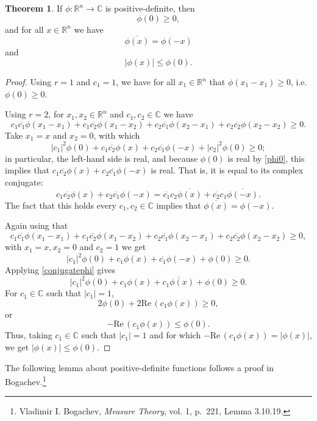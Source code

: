 \documentclass{article}
\def\Re{\ensuremath{\mathrm{Re}}\,}
\theoremstyle{definition}
\newtheorem{theorem}{Theorem}
\theoremstyle{definition}
\begin{document}
\begin{theorem}
If $\phi:\mathbb{R}^n \to \mathbb{C}$ is positive-definite, then
\begin{equation}
\phi(0) \geq 0,
\label{phi0}
\end{equation}
and for all $x \in \mathbb{R}^n$ we have
\begin{equation}
\overline{\phi(x)}=\phi(-x)
\label{conjugatephi}
\end{equation}
and
\begin{equation}
|\phi(x)| \leq \phi(0).
\label{phix}
\end{equation}
\end{theorem}
\begin{proof}
Using $r=1$ and $c_1=1$, we have for all $x_1 \in \mathbb{R}^n$ that
$\phi(x_1-x_1) \geq 0$,
i.e. $\phi(0) \geq 0$.

Using $r=2$,
for $x_1,x_2 \in \mathbb{R}^n$
and $c_1,c_2 \in \mathbb{C}$ we have
\[
c_1\overline{c_1}\phi(x_1-x_1)+c_1\overline{c_2}\phi(x_1-x_2)+c_2\overline{c_1}\phi(x_2-x_1)
+c_2\overline{c_2} \phi(x_2-x_2) \geq 0.
\]
Take $x_1=x$ and $x_2=0$, with which
\[
|c_1|^2 \phi(0) + c_1\overline{c_2} \phi(x)+c_2\overline{c_1}\phi(-x)+|c_2|^2 \phi(0) \geq 0;
\]
in particular, the left-hand side is real, and because $\phi(0)$ is real by \eqref{phi0}, this implies that
$c_1\overline{c_2} \phi(x)+c_2\overline{c_1}\phi(-x)$ is real. That is, it is equal to its complex conjugate:
\[
c_1\overline{c_2} \phi(x)+c_2\overline{c_1}\phi(-x) = \overline{c_1}c_2 \overline{\phi(x)}+\overline{c_2}c_1\overline{\phi(-x)}.
\]
The fact that this holds  every $c_1,c_2 \in \mathbb{C}$ implies that $\overline{\phi(x)} = \phi(-x)$. 

Again using that 
\[
c_1\overline{c_1}\phi(x_1-x_1)+c_1\overline{c_2}\phi(x_1-x_2)+c_2\overline{c_1}\phi(x_2-x_1)
+c_2\overline{c_2} \phi(x_2-x_2) \geq 0,
\]
 with $x_1=x,x_2=0$ and $c_2=1$ we get
\[
|c_1|^2\phi(0) +c_1\phi(x)+\overline{c_1}\phi(-x)+\phi(0) \geq 0.
\]
Applying \eqref{conjugatephi} gives
\[
|c_1|^2 \phi(0)+c_1\phi(x)+\overline{c_1 \phi(x)} + \phi(0) \geq 0.
\]
For $c_1 \in \mathbb{C}$ such that $|c_1|=1$,
\[
2\phi(0) + 2\Re \left( c_1 \phi(x) \right) \geq 0,
\]
or
\[
-\Re \left( c_1 \phi(x) \right) \leq \phi(0).
\]
Thus, taking $c_1 \in \mathbb{C}$ such that $|c_1|=1$ and for which $-\Re \left( c_1 \phi(x) \right) = |\phi(x)|$,
we get $|\phi(x)| \leq \phi(0)$. 
\end{proof}


The following lemma about positive-definite functions follows a proof in Bogachev.\footnote{Vladimir I. Bogachev, {\em Measure Theory}, vol. 1, p.~221, Lemma 3.10.19.}
\end{document}
